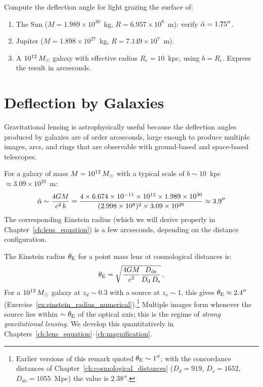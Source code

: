 \begin{exercise}
\label{ex:numerical_deflections}
Compute the deflection angle for light grazing the surface of:
\begin{enumerate}[label=(\alph*)]
    \item The Sun ($M = 1.989 \times 10^{30}$~kg,
          $R = 6.957 \times 10^{8}$~m): verify $\hat{\alpha} = 1.75''$.
    \item Jupiter ($M = 1.898 \times 10^{27}$~kg,
          $R = 7.149 \times 10^{7}$~m).
    \item A $10^{12}\,M_{\odot}$ galaxy with effective radius
          $R_e = 10$~kpc, using $b = R_e$.
          Express the result in arcseconds.
\end{enumerate}
\end{exercise}


\section{Deflection by Galaxies}
\label{sec:deflection_galaxies}

Gravitational lensing is astrophysically useful because the deflection
angles produced by galaxies are of order arcseconds, large enough to
produce multiple images, arcs, and rings that are observable with
ground-based and space-based telescopes.

For a galaxy of mass $M = 10^{12}\,M_{\odot}$ with a typical scale of
$b \sim 10$~kpc~$\approx 3.09 \times 10^{20}$~m:
\begin{equation}
    \hat{\alpha} \sim \frac{4G M}{c^2\, b}
    = \frac{4 \times 6.674 \times 10^{-11} \times 10^{12} \times 1.989 \times 10^{30}}
          {(2.998 \times 10^{8})^2 \times 3.09 \times 10^{20}}
    \approx 3.9''
    \label{eq:deflection_galaxy}
\end{equation}
The corresponding Einstein radius (which we will derive properly in
Chapter~\ref{ch:lens_equation}) is a few arcseconds, depending on the distance configuration.

\begin{remark}
The Einstein radius $\theta_{\mathrm{E}}$ for a point mass lens at cosmological
distances is:
\begin{equation}
    \theta_{\mathrm{E}} = \sqrt{\frac{4G M}{c^2}
    \frac{D_{\mathrm{ds}}}{D_{\mathrm{d}}\,D_{\mathrm{s}}}} \,.
    \label{eq:einstein_radius_deflection}
\end{equation}
For a $10^{12}\,M_{\odot}$ galaxy at $z_d \sim 0.3$ with a source at
$z_s \sim 1$, this gives $\theta_{\mathrm{E}} \approx 2.4''$
(Exercise~\ref{ex:einstein_radius_numerical}).\footnote{Earlier versions of
this remark quoted $\theta_{\mathrm{E}} \sim 1''$; with the concordance distances of
Chapter~\ref{ch:cosmological_distances} ($D_d = 919$, $D_s = 1652$, $D_{ds} = 1055$~Mpc) the value is
$2.38''$.}  Multiple images form
whenever the source lies within $\sim \theta_{\mathrm{E}}$ of the optical axis;
this is the regime of \emph{strong gravitational lensing}.  We
develop this quantitatively in Chapters~\ref{ch:lens_equation}--\ref{ch:magnification}.
\end{remark}


